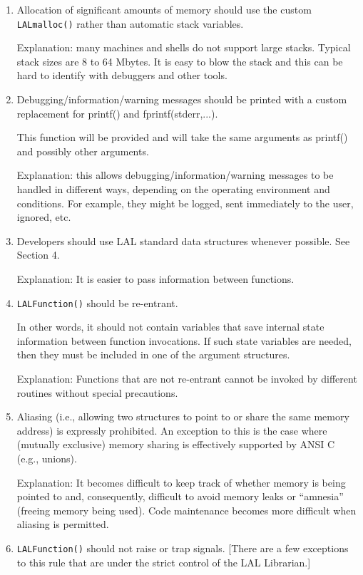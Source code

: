 \documentclass[]{ligodcc}
\begin{document}
\begin{enumerate}
\item
Allocation of significant amounts of memory should use the
custom {\tt LALmalloc()} rather than automatic stack variables.

Explanation: many machines and shells do not support large stacks.
Typical stack sizes are 8 to 64 Mbytes. It is easy to blow the stack
and this can be hard to identify with debuggers and other tools.

\item
Debugging/information/warning messages should be printed with
a custom replacement for printf() and fprintf(stderr,...).

This function will be provided and will take the same arguments as
printf() and possibly other arguments.

Explanation: this allows debugging/information/warning messages to be
handled in different ways, depending on the operating environment and
conditions. For example, they might be logged, sent immediately to the
user, ignored, etc.


\item
Developers should use LAL standard data structures whenever
possible. See Section 4.

Explanation: It is easier to pass information between functions.

\item
{\tt LALFunction()} should be re-entrant.


In other words, it should not contain variables that save internal
state information between function invocations. If such state
variables are needed, then they must be included in one of the argument structures.

Explanation: Functions that are not re-entrant cannot be invoked by
different routines without special precautions.

\item
Aliasing (i.e., allowing two structures to point to or share
the same memory address) is expressly prohibited. An exception to this
is the case where (mutually exclusive) memory sharing is effectively
supported by ANSI C (e.g., unions).

Explanation: It becomes difficult to keep track of whether memory is
being pointed to and, consequently, difficult to avoid memory leaks
or ``amnesia''  (freeing memory being used). Code maintenance becomes
more difficult when aliasing is permitted.

\item
{\tt LALFunction()} should not raise  or trap signals. 
[There are a few exceptions to this rule that are under the 
strict control of the LAL Librarian.]

\end{enumerate}
\end{document}
